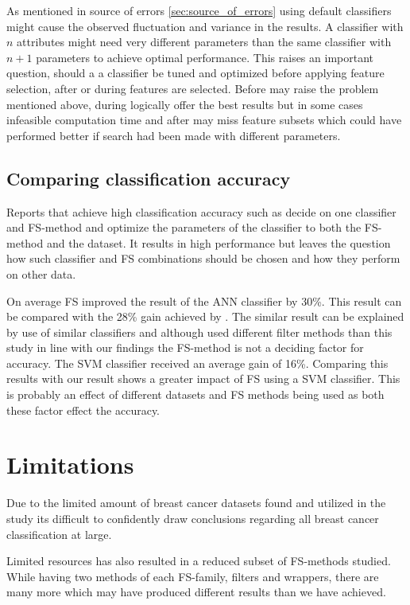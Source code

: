 As mentioned in source of errors \ref{sec:source_of_errors} using default classifiers might cause the observed fluctuation and variance in the results. A classifier with $n$ attributes might need very different parameters than the same classifier with $n + 1$ parameters to achieve optimal performance. This raises an important question, should a a classifier be tuned and optimized before applying feature selection, after or during features are selected. Before may raise the problem mentioned above, during logically offer the best results but in some cases infeasible computation time and after may miss feature subsets which could have performed better if search had been made with different parameters.

\subsection{Comparing classification accuracy}

Reports that achieve high classification accuracy such as \textcite{akay2009} decide on one classifier and FS-method and optimize the parameters of the classifier to both the FS-method and the dataset. It results in high performance but leaves the question how such classifier and FS combinations should be chosen and how they perform on other data.

On average FS improved the result of the ANN classifier by 30\%. This result can be compared with the 28\% gain achieved by \textcite{karabulut2012}. The similar result can be explained by use of similar classifiers and although \textcite{karabulut2012} used different filter methods than this study in line with our findings the FS-method is not a deciding factor for accuracy. The SVM classifier received an average gain of 16\%. Comparing this results with \textcite{b20103177} our result shows a greater impact of FS using a SVM classifier. This is probably an effect of different datasets and FS methods being used as both these factor effect the accuracy.

\section{Limitations}

Due to the limited amount of breast cancer datasets found and utilized in the study its difficult to confidently draw conclusions regarding all breast cancer classification at large.

Limited resources has also resulted in a reduced subset of FS-methods studied. While having two methods of each FS-family, filters and wrappers, there are many more which may have produced different results than we have achieved.



